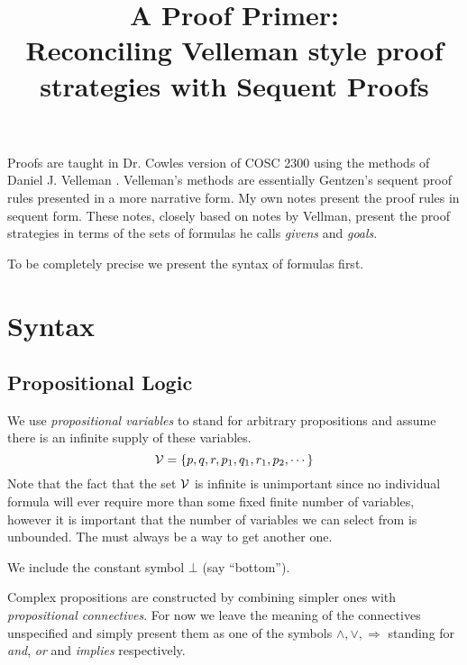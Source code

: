 \documentclass[11pt]{article}
\begin{document}
\title{A Proof Primer:\\Reconciling Velleman style proof strategies with Sequent Proofs}
\maketitle

Proofs are taught in Dr. Cowles version of COSC 2300 using the methods of
Daniel J. Velleman \cite{Velleman}.  Velleman's methods are essentially
Gentzen's sequent proof rules presented in a more narrative form.  My own notes
\cite{Caldwell_Discrete} present the proof rules in sequent form. These notes,
closely based on notes by Vellman, present the proof strategies in terms of the
sets of formulas he calls {\em{givens}} and {\em{goals}}.

To be completely precise we present the syntax of formulas first.


\section{Syntax}
\subsection{Propositional Logic}

We use {\em{propositional variables}} to stand for arbitrary propositions and
assume there is an infinite supply of these variables.
\[{\cal{V}}=\{p,q,r,p_1,q_1,r_1,p_2,\cdots\}\] Note that the fact that the set
${\cal{V}}$ is infinite is unimportant since no individual formula will ever
require more than some fixed finite number of variables, however it is
important that the number of variables we can select from is unbounded.  The
must always be a way to get another one.

We include the constant symbol $\bot$ (say ``bottom'').   

Complex propositions are constructed by combining simpler ones with {\em
propositional connectives}.   For now we leave
the meaning of the connectives unspecified and simply present them as one of
the symbols $\wedge, \vee, \Rightarrow$ standing for {\em{and}}, {\em{or}} and
{\em{implies}} respectively.
\end{document}
